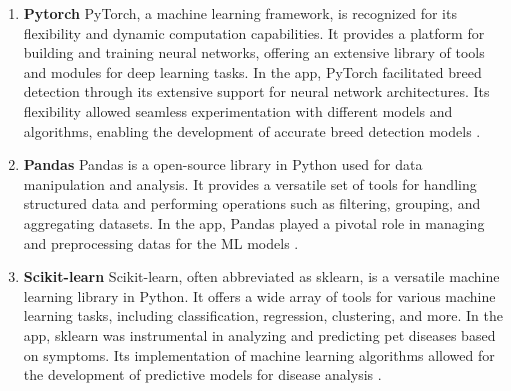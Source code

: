 \begin{enumerate}
    \item\textbf{Pytorch}
    PyTorch, a machine learning framework, is recognized for its flexibility and dynamic computation capabilities. It provides a platform for building and training neural networks, offering an extensive library of tools and modules for deep learning tasks. In the app, PyTorch facilitated breed detection through its  extensive support for neural network architectures. Its flexibility allowed seamless experimentation with different models and algorithms, enabling the development of accurate breed detection models \cite{21}.
    
    \item\textbf{Pandas}
    Pandas is a open-source library in Python used for data manipulation and analysis. It provides a versatile set of tools for handling structured data and performing operations such as filtering, grouping, and aggregating datasets. In the app, Pandas played a pivotal role in managing and preprocessing datas for the ML models \cite{19}.
    
    \item\textbf{Scikit-learn}
    Scikit-learn, often abbreviated as sklearn, is a versatile machine learning library in Python. It offers a wide array of tools for various machine learning tasks, including classification, regression, clustering, and more. In the app, sklearn was instrumental in analyzing and predicting pet diseases based on symptoms. Its  implementation of machine learning algorithms allowed for the development of predictive models for disease analysis \cite{20}.
    
\end{enumerate}

\newpage